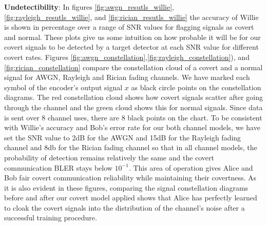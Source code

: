 \textbf{Undetectibility}: In figures \ref{fig:awgn_resutls_willie}, \ref{fig:rayleigh_resutls_willie}, and \ref{fig:rician_resutls_willie} the accuracy of Willie is shown in percentage over a range of SNR values for flagging signals as covert and normal. These plots give us some intuition on how probable it will be for our covert signals to be detected by a target detector at each SNR value for different covert rates. Figures \ref{fig:awgn_constellation},\ref{fig:rayleigh_constellation}), and \ref{fig:rician_constellation} compare the constellation cloud of a covert and a normal signal for AWGN, Rayleigh and Rician fading channels. We have marked each symbol of the encoder's output signal \(x\) as black circle points on the constellation diagrams. The red constellation cloud shows how covert signals scatter after going through the channel and the green cloud shows this for normal signals. Since data is sent over 8 channel uses, there are 8 black points on the chart. To be consistent with Willie's accuracy and Bob's error rate for our both channel models, we have set the SNR value to 2dB for the AWGN and 15dB for the Rayleigh fading channel and 8db for the Rician fading channel so that in all channel models, the probability of detection remains relatively the same and the covert communication BLER stays below \(10^{-1}\). This area of operation gives Alice and Bob fair covert communication reliability while maintaining their covertness. As it is also evident in these figures, comparing the signal constellation diagrams before and after our covert model applied shows that Alice has perfectly learned to cloak the covert signals into the distribution of the channel's noise after a successful training procedure.

